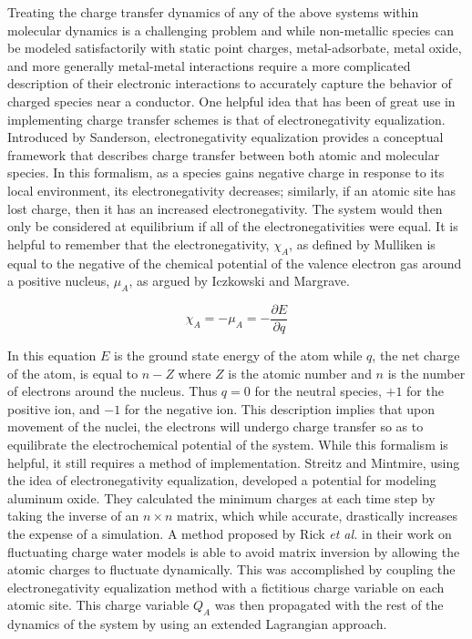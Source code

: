 Treating the charge transfer dynamics of any of the above systems within
molecular dynamics is a challenging problem and while non-metallic species can
be modeled satisfactorily with static point charges, metal-adsorbate, metal
oxide, and more generally metal-metal interactions require a more complicated
description of their electronic interactions to accurately capture the behavior
of charged species near a conductor. One helpful idea that has been of great
use in implementing charge transfer schemes is that of electronegativity
equalization. Introduced by Sanderson\citep{Sanderson:1951mz},
electronegativity equalization provides a conceptual framework that describes
charge transfer between both atomic and molecular species. In this formalism,
as a species gains negative charge in response to its local environment, its
electronegativity decreases; similarly, if an atomic site has lost charge, then
it has an increased electronegativity. The system would then only be considered
at equilibrium if all of the electronegativities were equal.  It is helpful to
remember that the electronegativity, $\chi_A$, as defined by
Mulliken\citep{Mulliken:1934wt} is equal to the negative of the chemical
potential of the valence electron gas around a positive nucleus, $\mu_A$, as
argued by Iczkowski and Margrave\citep{Iczkowski:1961wq}.

\begin{equation}
\chi_A = -\mu_A = -\frac{\partial E}{\partial q}
\end{equation}

In this equation $E$ is the ground state energy of the atom while $q$, the net
charge of the atom, is equal to $n - Z$ where $Z$ is the atomic number and $n$
is the number of electrons around the nucleus. Thus $q = 0$ for the neutral
species, $+1$ for the positive ion, and $-1$ for the negative ion.  This
description implies that upon movement of the nuclei, the electrons will
undergo charge transfer so as to equilibrate the electrochemical potential of
the system. While this formalism is helpful, it still requires a method of
implementation.  Streitz and Mintmire, using the idea of electronegativity
equalization, developed a potential for modeling aluminum oxide. They
calculated the minimum charges at each time step by taking the inverse of an
$n\times n$ matrix, which while accurate, drastically increases the expense of
a simulation.\citep{Streitz:1994mw} A method proposed by Rick {\it et al.} in
their work on fluctuating charge water models is able to avoid matrix inversion
by allowing the atomic charges to fluctuate dynamically. This was accomplished
by coupling the electronegativity equalization method with a fictitious charge
variable on each atomic site. This charge variable $Q_A$ was then propagated
with the rest of the dynamics of the system by using an extended Lagrangian
approach.\citep{Rick:1994ss}

